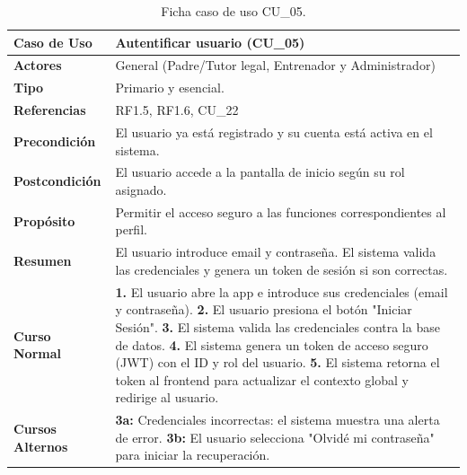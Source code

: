         \begin{table}[htbp]
        \centering
        \footnotesize
        \renewcommand{\arraystretch}{0.9}
        \begin{tabularx}{\textwidth}{|l|X|}
        \hline
        \rowcolor[HTML]{EFEFEF} 
        \textbf{Caso de Uso} & \textbf{Autentificar usuario (CU\_05)} \\ \hline
        \textbf{Actores} & General (Padre/Tutor legal, Entrenador y Administrador) \\ \hline
        \textbf{Tipo} & Primario y esencial. \\ \hline
        \textbf{Referencias} & RF1.5, RF1.6, CU\_22 \\ \hline
        \textbf{Precondición} & El usuario ya está registrado y su cuenta está activa en el sistema. \\ \hline
        \textbf{Postcondición} & El usuario accede a la pantalla de inicio según su rol asignado. \\ \hline
        \textbf{Propósito} & Permitir el acceso seguro a las funciones correspondientes al perfil. \\ \hline
        \textbf{Resumen} & El usuario introduce email y contraseña. El sistema valida las credenciales y genera un token de sesión si son correctas. \\ \hline
        \textbf{Curso Normal} & 
        \textbf{1.} El usuario abre la app e introduce sus credenciales (email y contraseña).\newline
        \textbf{2.} El usuario presiona el botón "Iniciar Sesión".\newline
        \textbf{3.} El sistema valida las credenciales contra la base de datos.\newline
        \textbf{4.} El sistema genera un token de acceso seguro (JWT) con el ID y rol del usuario.\newline
        \textbf{5.} El sistema retorna el token al frontend para actualizar el contexto global y redirige al usuario. \\ \hline
        \textbf{Cursos Alternos} & 
        \textbf{3a:} Credenciales incorrectas: el sistema muestra una alerta de error.\newline
        \textbf{3b:} El usuario selecciona "Olvidé mi contraseña" para iniciar la recuperación. \\ \hline
        \end{tabularx}
        \caption{Ficha caso de uso CU\_05.}
        \label{tab:cu_05}
        \end{table}


